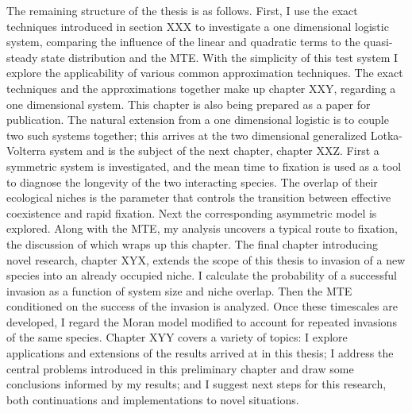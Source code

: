 The remaining structure of the thesis is as follows. 
First, I use the exact techniques introduced in section XXX to investigate a one dimensional logistic system, comparing the influence of the linear and quadratic terms to the quasi-steady state distribution and the MTE. 
With the simplicity of this test system I explore the applicability of various common approximation techniques. 
The exact techniques and the approximations together make up chapter XXY, regarding a one dimensional system. 
This chapter is also being prepared as a paper for publication. 
The natural extension from a one dimensional logistic is to couple two such systems together; this arrives at the two dimensional generalized Lotka-Volterra system and is the subject of the next chapter, chapter XXZ. 
First a symmetric system is investigated, and the mean time to fixation is used as a tool to diagnose the longevity of the two interacting species. 
The overlap of their ecological niches is the parameter that controls the transition between effective coexistence and rapid fixation. 
Next the corresponding asymmetric model is explored. 
Along with the MTE, my analysis uncovers a typical route to fixation, the discussion of which wraps up this chapter. 
The final chapter introducing novel research, chapter XYX, extends the scope of this thesis to invasion of a new species into an already occupied niche. 
I calculate the probability of a successful invasion as a function of system size and niche overlap. 
Then the MTE conditioned on the success of the invasion is analyzed. 
Once these timescales are developed, I regard the Moran model modified to account for repeated invasions of the same species. 
Chapter XYY covers a variety of topics: I explore applications and extensions of the results arrived at in this thesis; I address the central problems introduced in this preliminary chapter and draw some conclusions informed by my results; and I suggest next steps for this research, both continuations and implementations to novel situations. 


